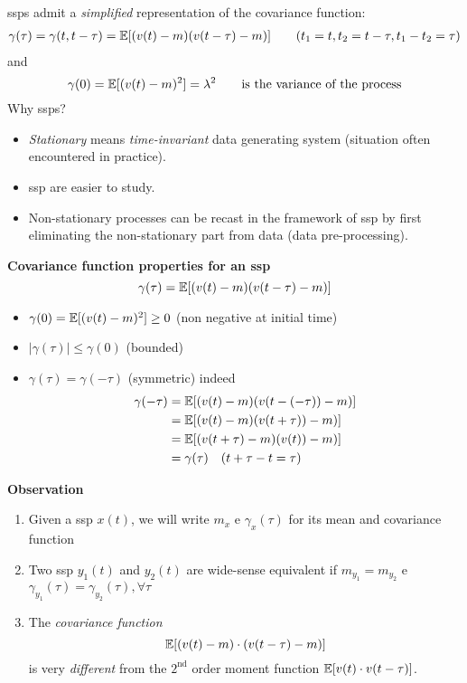 \glspl{ssp} admit a \emph{simplified} representation of the covariance function:
\begin{gather*}
\gamma(\tau)=\gamma(t, t-\tau)=\mathbb{E}[(v(t)-m)(v(t-\tau)-m)]\qquad (t_{1}=t, t_{2}=t-\tau, t_{1}-t_{2}=\tau)
\end{gather*}
and
\[
	\gamma(0)=\mathbb{E}[(v(t)-m)^{2}]=\lambda^2  \qquad \text{is the variance of the process}
\]
Why \glspl{ssp}?
\begin{itemize}
	\item \emph{Stationary} means \emph{time-invariant} data generating system (situation often encountered in practice).
	\item \gls{ssp} are easier to study.
	\item Non-stationary processes can be recast in the framework of \gls{ssp} by first eliminating the non-stationary part from data (data pre-processing).
\end{itemize}

\textbf{Covariance function properties for an \gls{ssp}}
$$
\gamma(\tau)=\mathbb{E}[(v(t)-m)(v(t-\tau)-m)]
$$
\begin{itemize}
	\item $\gamma(0)=\mathbb{E}[(v(t)-m)^{2}] \geq 0$ (non negative at initial time)
	\item $|\gamma(\tau)| \leq \gamma(0)$ (bounded)
	\item $\gamma(\tau)=\gamma(-\tau)$ (symmetric) indeed
	\begin{align*}
		\gamma(-\tau)&=\mathbb{E}[(v(t)-m)(v(t-(-\tau))-m)]\\
		&=\mathbb{E}[(v(t)-m)(v(t+\tau))-m)]\\
		&=\mathbb{E}[(v(t+\tau)-m)(v(t))-m)]\\
		&=\gamma(\tau) \quad(t+\tau-t=\tau)
	\end{align*}
\end{itemize}


\textbf{Observation}
\begin{enumerate}
	\item Given a \gls{ssp} $x(t)$, we will write $m_{x}$ e $\gamma_{x}(\tau)$ for its mean and covariance function
	\item Two \gls{ssp} $y_{1}(t)$ and $y_{2}(t)$ are wide-sense equivalent if $m_{y_{1}}=m_{y_{2}}$ e $\gamma_{y_{1}}(\tau)=\gamma_{y_{2}}(\tau), \forall \tau$
	\item The \emph{covariance function}
	$$
		\mathbb{E}[(v(t)-m) \cdot(v(t-\tau)-m)]
	$$
	is very \emph{different} from the $2^{\text{nd}}$ order moment function $\mathbb{E}[v(t) \cdot v(t-\tau)]$.
\end{enumerate}

